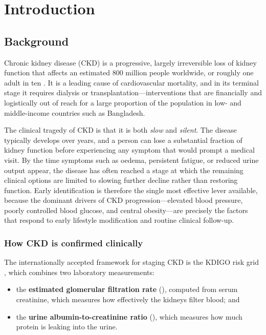 \chapter{Introduction}
\label{ch:introduction}

\section{Background}
\label{sec:background}

Chronic kidney disease (CKD) is a progressive, largely irreversible loss of
kidney function that affects an estimated 800 million people worldwide, or
roughly one adult in ten \cite{cdcbasics,kdigo2024}. It is a leading cause of
cardiovascular mortality, and in its terminal stage it requires dialysis or
transplantation---interventions that are financially and logistically out of
reach for a large proportion of the population in low- and middle-income
countries such as Bangladesh.

The clinical tragedy of CKD is that it is both \emph{slow} and \emph{silent}.
The disease typically develops over years, and a person can lose a substantial
fraction of kidney function before experiencing any symptom that would prompt a
medical visit. By the time symptoms such as oedema, persistent fatigue, or
reduced urine output appear, the disease has often reached a stage at which the
remaining clinical options are limited to slowing further decline rather than
restoring function. Early identification is therefore the single most effective
lever available, because the dominant drivers of CKD progression---elevated
blood pressure, poorly controlled blood glucose, and central obesity---are
precisely the factors that respond to early lifestyle modification and routine
clinical follow-up.

\subsection{How CKD is confirmed clinically}

The internationally accepted framework for staging CKD is the KDIGO risk grid
\cite{kdigo2024}, which combines two laboratory measurements:

\begin{itemize}
  \item the \textbf{estimated glomerular filtration rate} (\eGFR), computed
        from serum creatinine, which measures how effectively the kidneys
        filter blood; and
  \item the \textbf{urine albumin-to-creatinine ratio} (\UACR), which measures
        how much protein is leaking into the urine.
\end{itemize}

